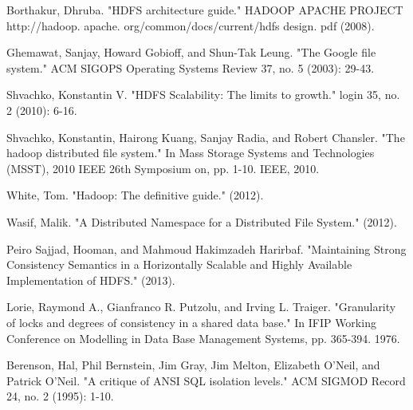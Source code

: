 \documentclass[runningheads,a4paper]{llncs}
\begin{document}
\begin{thebibliography}{4}

 Borthakur, Dhruba. "HDFS architecture guide." HADOOP APACHE PROJECT http://hadoop. apache. org/common/docs/current/hdfs design. pdf (2008).

 Ghemawat, Sanjay, Howard Gobioff, and Shun-Tak Leung. "The Google file system." ACM SIGOPS Operating Systems Review 37, no. 5 (2003): 29-43.

 Shvachko, Konstantin V. "HDFS Scalability: The limits to growth." login 35, no. 2 (2010): 6-16.

 Shvachko, Konstantin, Hairong Kuang, Sanjay Radia, and Robert Chansler. "The hadoop distributed file system." In Mass Storage Systems and Technologies (MSST), 2010 IEEE 26th Symposium on, pp. 1-10. IEEE, 2010.

 White, Tom. "Hadoop: The definitive guide." (2012).

 Wasif, Malik. "A Distributed Namespace for a Distributed File System." (2012).

 Peiro Sajjad, Hooman, and Mahmoud Hakimzadeh Harirbaf. "Maintaining Strong Consistency Semantics in a Horizontally Scalable and Highly Available Implementation of HDFS." (2013).

 Lorie, Raymond A., Gianfranco R. Putzolu, and Irving L. Traiger. "Granularity of locks and degrees of consistency in a shared data base." In IFIP Working Conference on Modelling in Data Base Management Systems, pp. 365-394. 1976.

 Berenson, Hal, Phil Bernstein, Jim Gray, Jim Melton, Elizabeth O'Neil, and Patrick O'Neil. "A critique of ANSI SQL isolation levels." ACM SIGMOD Record 24, no. 2 (1995): 1-10.

\end{thebibliography}
\end{document}
